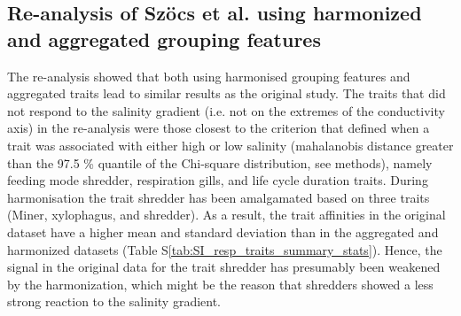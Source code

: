 \documentclass{article}
\begin{document}
\subsection*{Re-analysis of Szöcs et al. using harmonized and aggregated grouping features}

The re-analysis showed that both using harmonised grouping features and aggregated traits lead to similar results as the original study.
The traits that did not respond to the salinity gradient (i.e. not on the extremes of the conductivity axis) in the re-analysis were those closest to the criterion that defined when a trait was associated with either high or low salinity (mahalanobis distance greater than the 97.5 \% quantile of the Chi-square distribution, see methods), namely feeding mode shredder, respiration gills, and life cycle duration traits. During harmonisation the trait shredder has been amalgamated based on three traits (Miner, xylophagus, and shredder). As a result, the trait affinities in the original dataset have a higher mean and standard deviation than in the aggregated and harmonized datasets (Table S\ref{tab:SI_resp_traits_summary_stats}). Hence, the signal in the original data for the trait shredder has presumably been weakened by the harmonization, which might be the reason that shredders showed a less strong reaction to the salinity gradient. 
\end{document}
